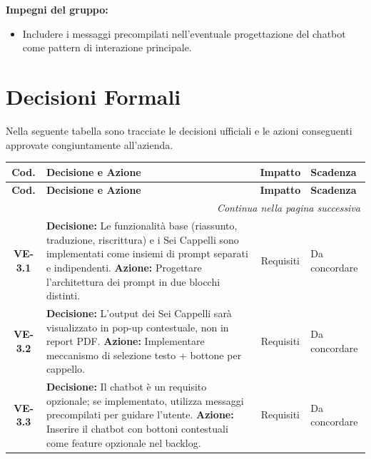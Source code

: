 \vspace{0.1cm}
\textbf{Impegni del gruppo:}
\begin{itemize}[leftmargin=1.5em, itemsep=3pt]
    \item Includere i messaggi precompilati nell'eventuale progettazione del chatbot come pattern di interazione principale.
\end{itemize}

\section{Decisioni Formali}
Nella seguente tabella sono tracciate le decisioni ufficiali e le azioni conseguenti approvate congiuntamente all'azienda.

\renewcommand{\arraystretch}{1.4}

\begin{longtable}{c p{10.5cm} c l}
\toprule
\textbf{Cod.} & \textbf{Decisione e Azione} & \textbf{Impatto} & \textbf{Scadenza} \\
\midrule
\endfirsthead

\toprule
\textbf{Cod.} & \textbf{Decisione e Azione} & \textbf{Impatto} & \textbf{Scadenza} \\
\midrule
\endhead

\midrule
\multicolumn{4}{r}{\textit{Continua nella pagina successiva}} \\
\midrule
\endfoot

\bottomrule
\endlastfoot

\textbf{VE-3.1} &
\textbf{Decisione:} Le funzionalità base (riassunto, traduzione, riscrittura) e i Sei Cappelli sono implementati come insiemi di prompt separati e indipendenti.\newline
\textbf{Azione:} Progettare l'architettura dei prompt in due blocchi distinti. &
Requisiti & Da concordare \\

\textbf{VE-3.2} &
\textbf{Decisione:} L'output dei Sei Cappelli sarà visualizzato in pop-up contestuale, non in report PDF.\newline
\textbf{Azione:} Implementare meccanismo di selezione testo + bottone per cappello. &
Requisiti & Da concordare \\

\textbf{VE-3.3} &
\textbf{Decisione:} Il chatbot è un requisito opzionale; se implementato, utilizza messaggi precompilati per guidare l'utente.\newline
\textbf{Azione:} Inserire il chatbot con bottoni contestuali come feature opzionale nel backlog. &
Requisiti & Da concordare \\

\end{longtable}

